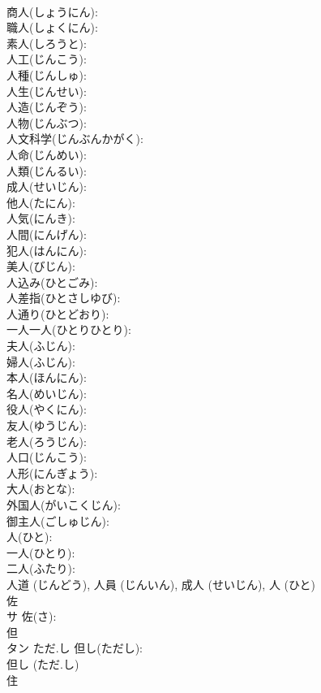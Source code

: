 \documentclass[8pt]{extreport}
\begin{document}
\begin{CJK}{UTF8}{min}
\\	商人(しょうにん): 
\\	職人(しょくにん): 
\\	素人(しろうと): 
\\	人工(じんこう): 
\\	人種(じんしゅ): 
\\	人生(じんせい): 
\\	人造(じんぞう): 
\\	人物(じんぶつ): 
\\	人文科学(じんぶんかがく): 
\\	人命(じんめい): 
\\	人類(じんるい): 
\\	成人(せいじん): 
\\	他人(たにん): 
\\	人気(にんき): 
\\	人間(にんげん): 
\\	犯人(はんにん): 
\\	美人(びじん): 
\\	人込み(ひとごみ): 
\\	人差指(ひとさしゆび): 
\\	人通り(ひとどおり): 
\\	一人一人(ひとりひとり): 
\\	夫人(ふじん): 
\\	婦人(ふじん): 
\\	本人(ほんにん): 
\\	名人(めいじん): 
\\	役人(やくにん): 
\\	友人(ゆうじん): 
\\	老人(ろうじん): 
\\	人口(じんこう): 
\\	人形(にんぎょう): 
\\	大人(おとな): 
\\	外国人(がいこくじん): 
\\	御主人(ごしゅじん): 
\\	人(ひと): 
\\	一人(ひとり): 
\\	二人(ふたり): 
\\	人道 (じんどう), 人員 (じんいん), 成人 (せいじん), 人 (ひと)
\\	佐			
\\	サ		佐(さ): 
\\	但			
\\	タン	ただ.し	但し(ただし): 
\\	但し (ただ.し)
\\	住			

\end{CJK}
\end{document}
